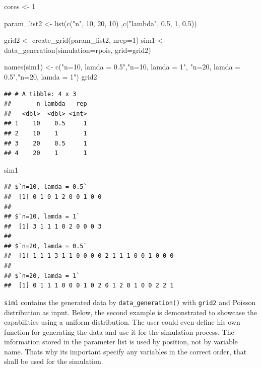 \documentclass[11pt,a4paper]{article}
\newenvironment{Shaded}{\begin{snugshade}}{\end{snugshade}}
\newcommand{\AttributeTok}[1]{\textcolor[rgb]{0.77,0.63,0.00}{#1}}
\newcommand{\DecValTok}[1]{\textcolor[rgb]{0.00,0.00,0.81}{#1}}
\newcommand{\FloatTok}[1]{\textcolor[rgb]{0.00,0.00,0.81}{#1}}
\newcommand{\FunctionTok}[1]{\textcolor[rgb]{0.00,0.00,0.00}{#1}}
\newcommand{\NormalTok}[1]{#1}
\newcommand{\OtherTok}[1]{\textcolor[rgb]{0.56,0.35,0.01}{#1}}
\newcommand{\StringTok}[1]{\textcolor[rgb]{0.31,0.60,0.02}{#1}}
\begin{document}
\begin{Shaded}
\begin{Highlighting}[]
\NormalTok{cores }\OtherTok{\textless{}{-}} \DecValTok{1}


\NormalTok{param\_list2 }\OtherTok{\textless{}{-}} \FunctionTok{list}\NormalTok{(}\FunctionTok{c}\NormalTok{(}\StringTok{"n"}\NormalTok{, }\DecValTok{10}\NormalTok{, }\DecValTok{20}\NormalTok{, }\DecValTok{10}\NormalTok{)}
\NormalTok{                  ,}\FunctionTok{c}\NormalTok{(}\StringTok{"lambda"}\NormalTok{, }\FloatTok{0.5}\NormalTok{, }\DecValTok{1}\NormalTok{, }\FloatTok{0.5}\NormalTok{))}



\NormalTok{grid2 }\OtherTok{\textless{}{-}} \FunctionTok{create\_grid}\NormalTok{(param\_list2, }\AttributeTok{nrep=}\DecValTok{1}\NormalTok{)}
\NormalTok{sim1 }\OtherTok{\textless{}{-}} \FunctionTok{data\_generation}\NormalTok{(}\AttributeTok{simulation=}\NormalTok{rpois, }\AttributeTok{grid=}\NormalTok{grid2)}


\FunctionTok{names}\NormalTok{(sim1) }\OtherTok{\textless{}{-}} \FunctionTok{c}\NormalTok{(}\StringTok{"n=10, lamda = 0.5"}\NormalTok{,}\StringTok{"n=10, lamda = 1"}\NormalTok{,}
                 \StringTok{"n=20, lamda = 0.5"}\NormalTok{,}\StringTok{"n=20, lamda = 1"}\NormalTok{)}
\NormalTok{grid2}
\end{Highlighting}
\end{Shaded}

\begin{verbatim}
## # A tibble: 4 x 3
##       n lambda   rep
##   <dbl>  <dbl> <int>
## 1    10    0.5     1
## 2    10    1       1
## 3    20    0.5     1
## 4    20    1       1
\end{verbatim}

\begin{Shaded}
\begin{Highlighting}[]
\NormalTok{sim1}
\end{Highlighting}
\end{Shaded}

\begin{verbatim}
## $`n=10, lamda = 0.5`
##  [1] 0 1 0 1 2 0 0 1 0 0
## 
## $`n=10, lamda = 1`
##  [1] 3 1 1 1 0 2 0 0 0 3
## 
## $`n=20, lamda = 0.5`
##  [1] 1 1 1 3 1 1 0 0 0 0 2 1 1 1 0 0 1 0 0 0
## 
## $`n=20, lamda = 1`
##  [1] 0 1 1 1 0 0 0 1 0 2 0 1 2 0 1 0 0 2 2 1
\end{verbatim}

\texttt{sim1} contains the generated data by \texttt{data\_generation()}
with \texttt{grid2} and Poisson distribution as input. Below, the second
example is demonstrated to showcase the capabilities using a uniform
distribution. The user could even define his own function for generating
the data and use it for the simulation process. The information stored
in the parameter list is used by position, not by variable name. Thats
why its important specify any variables in the correct order, that shall
be used for the simulation.
\end{document}
